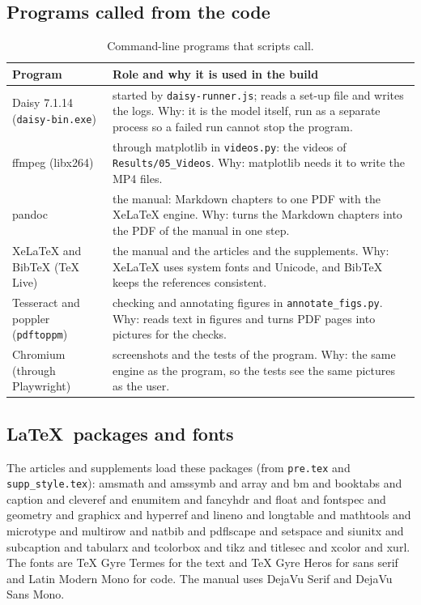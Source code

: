 \subsection{Programs called from the code}
\begin{table}[H]\centering\small
\caption{Command-line programs that scripts call.}\label{tab:progs}
\begin{tabular}{@{}>{\raggedright\arraybackslash}p{3.3cm}>{\raggedright\arraybackslash}p{9.7cm}@{}}
\toprule Program & Role and why it is used in the build\\\midrule
Daisy 7.1.14 (\texttt{daisy-bin.exe}) & started by \texttt{daisy-runner.js}; reads a set-up file and writes the logs. Why: it is the model itself, run as a separate process so a failed run cannot stop the program.\\
ffmpeg (libx264) & through matplotlib in \texttt{videos.py}: the videos of \texttt{Results/05\_Videos}. Why: matplotlib needs it to write the MP4 files.\\
pandoc & the manual: Markdown chapters to one PDF with the XeLaTeX engine. Why: turns the Markdown chapters into the PDF of the manual in one step.\\
XeLaTeX and BibTeX (TeX Live) & the manual and the articles and the supplements. Why: XeLaTeX uses system fonts and Unicode, and BibTeX keeps the references consistent.\\
Tesseract and poppler (\texttt{pdftoppm}) & checking and annotating figures in \texttt{annotate\_figs.py}. Why: reads text in figures and turns PDF pages into pictures for the checks.\\
Chromium (through Playwright) & screenshots and the tests of the program. Why: the same engine as the program, so the tests see the same pictures as the user.\\
\bottomrule\end{tabular}\end{table}

\subsection{\LaTeX\ packages and fonts}
The articles and supplements load these packages (from \texttt{pre.tex} and \texttt{supp\_style.tex}): amsmath and amssymb and array and bm and booktabs and caption and cleveref and enumitem and fancyhdr and float and fontspec and geometry and graphicx and hyperref and lineno and longtable and mathtools and microtype and multirow and natbib and pdflscape and setspace and siunitx and subcaption and tabularx and tcolorbox and tikz and titlesec and xcolor and xurl. The fonts are TeX Gyre Termes for the text and TeX Gyre Heros for sans serif and Latin Modern Mono for code. The manual uses DejaVu Serif and DejaVu Sans Mono.

